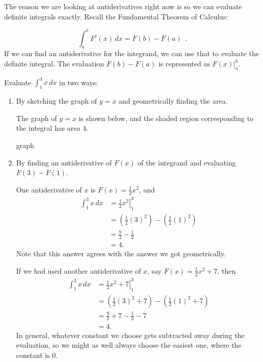 The reason we are looking at antiderivatives right now is so we can evaluate definite integrals exactly. Recall the Fundamental Theorem of Calculus:

$$\int_a^b F'(x)\, dx =F(b)-F(a) \enspace .$$
If we can find an antiderivative for the integrand, we can use that to evaluate the definite integral. The evaluation $F(b)-F(a)$ is represented as $\left. F(x)\right|_a^b$.

\begin{example}
Evaluate $\int_1^3 x\, dx$  in two ways:
  \begin{enumerate}[label=(\alph*)]
    \item By sketching the graph of $y=x$ and geometrically finding the area.
    \begin{solution}
      The graph of $y=x$ is shown below, and the shaded region corresponding to the integral has area 4.

      graph
    \end{solution}
    \item By finding an antiderivative of $F(x)$ of the integrand and evaluating $F(3)-F(1)$.
      \begin{solution}
        One antiderivative of $x$ is $F(x)=\frac{1}{2}x^2$, and
         \begin{align*}
         \int_1^3 x\, dx &= \left.\frac{1}{2}x^2\right|_1^3 \\
         &= \left(\frac{1}{2}(3)^2\right) - \left(\frac{1}{2}(1)^2\right)\\
         &= \frac{9}{2} - \frac{1}{2} \\
         &= 4.
       \end{align*}
     Note that this answer agrees with the answer we got geometrically.

     If we had used another antiderivative of $x$, say $F(x)=\frac{1}{2}x^2+7$, then
     \begin{align*}
     \int_1^3 x\, dx &= \left.\frac{1}{2}x^2 + 7\right|_1^3 \\
     &= \left(\frac{1}{2}(3)^2+ 7\right) - \left(\frac{1}{2}(1)^2+ 7\right)\\
     &= \frac{9}{2}+ 7 - \frac{1}{2} - 7 \\
     &= 4.
     \end{align*}
     In general, whatever constant we choose gets subtracted away during the evaluation, so we might as well always choose the easiest one, where the constant is 0.
     \end{solution}
   \end{enumerate}
\end{example}

